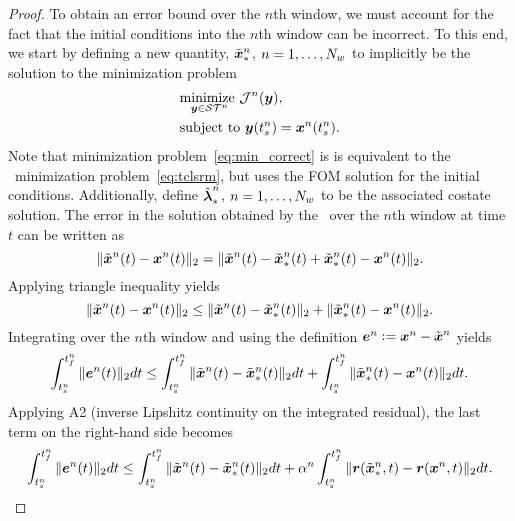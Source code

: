 \begin{proof}
To obtain an error bound over the $n$th window, we must account for the 
fact that the initial conditions into the $n$th window can be incorrect. To this end, 
we start by defining a new quantity, $\tilde{\boldsymbol x}_{*}^{n}$, $n=1,\ldots,N_w$ to implicitly be the solution to the minimization problem 
\begin{equation}\label{eq:min_correct}
\begin{split}
& \underset{\boldsymbol y \in \mathcal{ ST }^{n}}{\text{minimize } }
\mathcal{J}^{n}(\boldsymbol y),\\
& \text{subject to } \boldsymbol y(t_s^{n})= {\boldsymbol x}^{n}(t_s^{n}).
\end{split}
\end{equation}
Note that minimization problem~\eqref{eq:min_correct} is is equivalent to the \methodAcronym\ minimization problem~\eqref{eq:tclsrm}, but uses the FOM solution for the initial conditions. 
Additionally, define $\hat{\boldsymbol \lambda}_*^{n}$, $n=1,\ldots,N_w$ to be the associated costate solution.
 The error in the solution obtained by the 
\methodAcronymROM\ over the $n$th window at time $t$ can be written as
\begin{equation*}
\|  \tilde{\boldsymbol x}^{n}(t) - {\boldsymbol x}^{n}(t) \|_2 = 
\| \tilde{\boldsymbol x}^{n}(t) - \tilde{\boldsymbol x}_{*}^{n}(t) + \tilde{\boldsymbol x}_{*}^{n}(t) -  {\boldsymbol x}^{n}(t)  \|_2.
\end{equation*}
Applying triangle inequality yields
\begin{equation*}
\|  \tilde{\boldsymbol x}^{n}(t) - {\boldsymbol x}^{n}(t) \|_2 \le 
\| \tilde{\boldsymbol x}^{n}(t) - \tilde{\boldsymbol x}_{*}^{n}(t) \|_2 + \|  \tilde{\boldsymbol x}_{*}^{n}(t) -  {\boldsymbol x}^{n}(t)  \|_2.
\end{equation*}
Integrating over the $n$th window and using the definition $\boldsymbol e^{n} \vcentcolon= {\boldsymbol x}^{n} - \tilde{\boldsymbol x}^{n}$ yields
$$\int_{t_s^{n}}^{t_f^{n}} \| \boldsymbol e^{n}(t) \|_2 dt \le \int_{t_s^{n}}^{t_f^{n}} \| \tilde{\boldsymbol x}^{n}(t) - \tilde{\boldsymbol x}_{*}^{n}(t) \|_2 dt +  \int_{t_s^{n}}^{t_f^{n}} \| \tilde{\boldsymbol x}_{*}^{n}(t) - {\boldsymbol x}^{n}(t) \|_2dt.$$
Applying A2 (inverse Lipshitz continuity on the integrated residual), the last term on the right-hand side becomes
\begin{equation*}
\intSlabArg{n} \norm{\errorArgt{n}{t}} dt \le \intSlabArg{n} \norm{\stateROMSolArgt{n}{t} - \stateROMStarSolArgt{n}{t}} dt +  \lipshitziArg{n} \intSlabArg{n} \norm{ \resid(\stateROMStarSolArg{n},t) - \resid(\stateFOMSolArg{n},t)} dt.

\end{equation*}
\end{proof}
